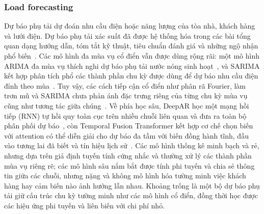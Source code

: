 \documentclass[conference]{IEEEtran}
\begin{document}
\subsubsection{Load forecasting}
Dự báo phụ tải dự đoán nhu cầu điện hoặc năng lượng của tòa nhà, khách hàng và lưới điện. Dự báo phụ tải xác suất đã được
hệ thống hóa trong các bài tổng quan dạng hướng dẫn, tóm tắt kỹ thuật, tiêu chuẩn đánh giá và những ngộ nhận
phổ biến~\cite{Hong2016Probabilistic}. Các mô hình đa mùa vụ cổ điển vẫn được dùng rộng rãi: một mô hình ARIMA đa mùa vụ
thích nghi dự báo phụ tải nước nóng sinh hoạt~\cite{Nagpal2025ARIMA}, và SARIMA kết hợp phân tích phổ các thành phần chu
kỳ được dùng để dự báo nhu cầu điện đỉnh theo mùa~\cite{MelchorCruz2025Spectral}. Tuy vậy, các cách tiếp cận cổ điển như
phân rã Fourier, làm trơn mũ và SARIMA chưa phản ánh đặc trưng riêng của từng chu kỳ mùa vụ cũng như tương tác giữa
chúng~\cite{Moon2022MixedPooling}. Về phía học sâu, DeepAR học một mạng hồi tiếp (RNN) tự hồi quy toàn cục trên
nhiều chuỗi liên quan và đưa ra toàn bộ phân phối dự báo~\cite{Salinas2020DeepAR}, còn Temporal Fusion Transformer kết hợp
cơ chế chọn biến với attention có thể diễn giải cho dự báo đa tầm với biến đồng hành tĩnh, đầu vào tương lai đã biết và
tín hiệu lịch sử~\cite{Lim2021TFT}. Các mô hình thống kê minh bạch và rẻ, nhưng dựa trên giả định tuyến tính cứng nhắc và
thường xử lý các thành phần mùa vụ riêng rẽ; các mô hình sâu nắm bắt được tính phi tuyến và chia sẻ thông tin giữa các
chuỗi, nhưng nặng và không mô hình hóa tường minh việc khách hàng hay cảm biến nào ảnh hưởng lẫn nhau. Khoảng trống là
một bộ dự báo phụ tải giữ cấu trúc chu kỳ tường minh như các mô hình cổ điển, đồng thời học được các hiệu ứng phi tuyến
và liên biến với chi phí nhỏ.
\end{document}
